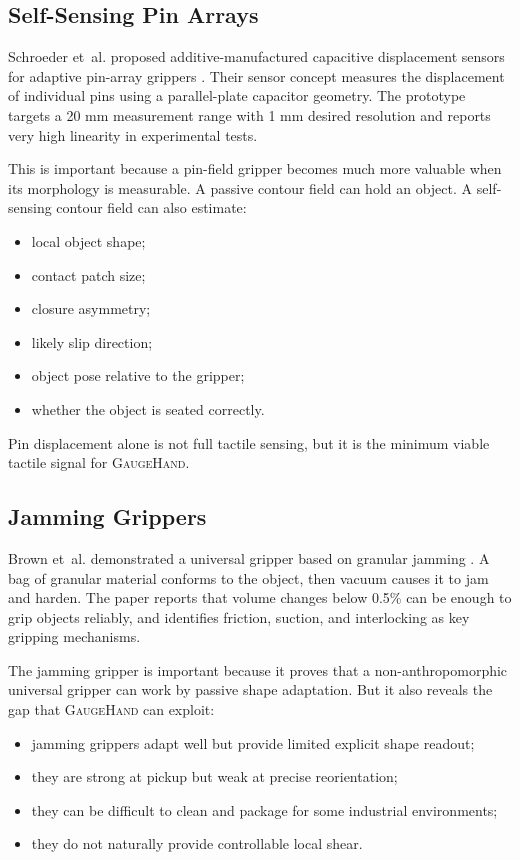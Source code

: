 \documentclass[11pt]{article}
\newcommand{\GaugeHand}{\textsc{GaugeHand}}
\newcommand{\etal}{et~al.}
\begin{document}
\subsection{Self-Sensing Pin Arrays}

Schroeder \etal{} proposed additive-manufactured capacitive displacement sensors for adaptive pin-array grippers \cite{schroeder2025capacitive}. Their sensor concept measures the displacement of individual pins using a parallel-plate capacitor geometry. The prototype targets a 20 mm measurement range with 1 mm desired resolution and reports very high linearity in experimental tests.

This is important because a pin-field gripper becomes much more valuable when its morphology is measurable. A passive contour field can hold an object. A self-sensing contour field can also estimate:

\begin{itemize}[leftmargin=*]
  \item local object shape;
  \item contact patch size;
  \item closure asymmetry;
  \item likely slip direction;
  \item object pose relative to the gripper;
  \item whether the object is seated correctly.
\end{itemize}

Pin displacement alone is not full tactile sensing, but it is the minimum viable tactile signal for \GaugeHand{}.

\subsection{Jamming Grippers}

Brown \etal{} demonstrated a universal gripper based on granular jamming \cite{brown2010jamming}. A bag of granular material conforms to the object, then vacuum causes it to jam and harden. The paper reports that volume changes below 0.5\% can be enough to grip objects reliably, and identifies friction, suction, and interlocking as key gripping mechanisms.

The jamming gripper is important because it proves that a non-anthropomorphic universal gripper can work by passive shape adaptation. But it also reveals the gap that \GaugeHand{} can exploit:

\begin{itemize}[leftmargin=*]
  \item jamming grippers adapt well but provide limited explicit shape readout;
  \item they are strong at pickup but weak at precise reorientation;
  \item they can be difficult to clean and package for some industrial environments;
  \item they do not naturally provide controllable local shear.
\end{itemize}
\end{document}

